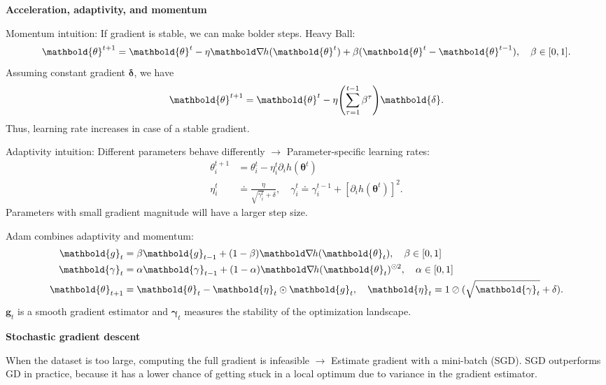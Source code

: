 \documentclass[10pt]{article}
\newenvironment{topic}[1]
{\textbf{\sffamily \footnotesize \colorbox{black}{\rlap{\textbf{\textcolor{white}{#1}}}\hspace{\linewidth}\hspace{-2\fboxsep}}}}
{}
\newenvironment{subtopic}[1]
{\vspace{0.1cm} \begin{center}\textbf{\footnotesize \sffamily #1}\end{center}}
{}
\renewcommand{\vec}[1]{\ensuremath{\mathbold{#1}}}
\begin{document}
\begin{multicols*}{3}
\begin{topic}{Gradient-based learning}
\begin{subtopic}{Acceleration, adaptivity, and momentum}
            Momentum intuition: If gradient is stable, we can make bolder steps. Heavy Ball: \[
                \vec{\theta}^{t+1} = \vec{\theta}^t - \eta \grad{h(\vec{\theta}^t)}{} + \beta (\vec{\theta}^t - \vec{\theta}^{t-1}), \quad \beta \in [0,1].
            \]
            Assuming constant gradient $\vec{\delta}$, we have \[
                \vec{\theta}^{t+1} = \vec{\theta}^t - \eta \lft( \sum_{\tau=1}^{t-1} \beta^{\tau} \rgt) \vec{\delta}.
            \]
            Thus, learning rate increases in case of a stable gradient.

            Adaptivity intuition: Different parameters behave differently $\to$ Parameter-specific learning
            rates:
            \begin{align*}
                \theta_i^{t+1} & = \theta_i^t - \eta_i^t \partial_i h(\vec{\theta}^t)                                                                       \\
                \eta_i^t       & \doteq \frac{\eta}{\sqrt{\gamma_i^t} + \delta}, \quad \gamma_i^t \doteq \gamma_i^{t-1} + [\partial_i h(\vec{\theta}^t)]^2.
            \end{align*}
            Parameters with small gradient magnitude will have a larger step size.

            Adam combines adaptivity and momentum:
            \begin{align*}
                \vec{g}_t          & = \beta \vec{g}_{t-1} + (1-\beta) \grad{h(\vec{\theta}_t)}{}, \quad \beta \in [0,1]                               \\
                \vec{\gamma}_t     & = \alpha\vec{\gamma}_{t-1} + (1-\alpha) \grad{h(\vec{\theta}_t)}{}^{\odot 2}, \quad \alpha \in [0,1]              \\
                \vec{\theta}_{t+1} & = \vec{\theta}_t - \vec{\eta}_t \odot \vec{g}_t, \quad \vec{\eta}_t = 1 \oslash (\sqrt{\vec{\gamma}_t} + \delta).
            \end{align*}
            $\vec{g}_t$ is a smooth gradient estimator and $\vec{\gamma}_t$ measures the stability of the optimization landscape.
        \end{subtopic}

        \begin{subtopic}{Stochastic gradient descent}
            When the dataset is too large, computing the full gradient is infeasible $\to$ Estimate
            gradient with a mini-batch (SGD). SGD outperforms GD in practice, because it has a lower
            chance of getting stuck in a local optimum due to variance in the gradient estimator.
        \end{subtopic}


\end{topic}
\end{multicols*}
\end{document}
